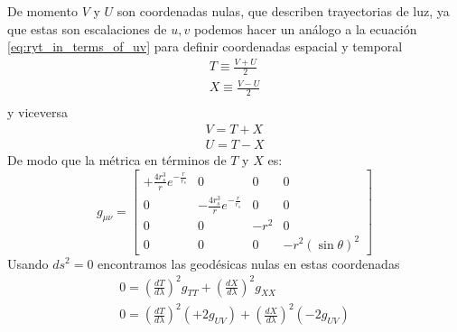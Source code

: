 De momento $V$ y $U$ son coordenadas nulas, que describen trayectorias de luz, ya que estas son escalaciones de $u,v$ podemos hacer un análogo a la ecuación \ref{eq:ryt_in_terms_of_uv} para definir coordenadas espacial y temporal 
\begin{equation}
    \begin{aligned}
        T \equiv \frac{V+U}{2} \\
        X \equiv \frac{V-U}{2} \\
    \end{aligned}
\end{equation}
y viceversa
\begin{equation}
    \begin{aligned}
        V=T+X \\
        U=T-X
    \end{aligned}
\end{equation}
De modo que la métrica en términos de $T$ y $X$ es:
\begin{equation}
        g_{\mu \nu} =\left[\begin{array}{cccc}
                                             +\frac{4 r_s^3}{r} e^{-\frac{r}{r_s}} & 0                                     & 0    & 0                   \\
                                             0                                     & -\frac{4 r_s^3}{r} e^{-\frac{r}{r_s}} & 0    & 0                   \\
                                             0                                     & 0                                     & -r^2 & 0                   \\
                                             0                                     & 0                                     & 0    & -r^2(\sin \theta)^2
                                         \end{array}\right]
\end{equation}
Usando $ds^2 = 0 $ encontramos las geodésicas nulas en estas coordenadas
\begin{equation}
    \begin{array}{l}
        
        0=\left(\frac{d T}{d \lambda}\right)^2 g_{T T}+\left(\frac{d X}{d \lambda}\right)^2 g_{X X}                                                                                                                                     \\
        0=\left(\frac{d T}{d \lambda}\right)^2\left(+2 g_{U V}\right)+\left(\frac{d X}{d \lambda}\right)^2\left(-2 g_{U V}\right)
    \end{array}
\end{equation}

